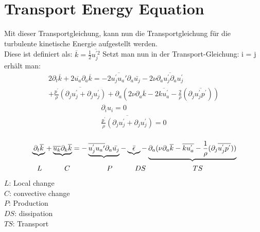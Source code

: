 \documentclass[11pt,t]{beamer}
\newcommand*\mean[1]{\overline{#1}}
\begin{document}
\section{Transport Energy Equation}
\begin{frame}
Mit dieser Transportgleichung, kann nun die Transportgleichung für die turbulente kinetische Energie aufgestellt werden.\\
Diese ist definiert als: $\mean{k} = \frac{1}{2}\mean{u_j^{'2}}$
Setzt man nun in der Transport-Gleichung: i = j erhält man:
\begin{align*}
2\partial_t \mean{k} + 2\mean{u_a}\partial_a \mean{k} = -2\overline{u_j^{'}u_a{'}}\partial_a\bar{u_j}
- 2\nu\overline{\partial_au_j^{'}\partial_au_j^{'}}\\+\overline{\frac{p^{'}}{\rho}(\partial_ju_j^{'}+\partial_ju_j^{'})}+\partial_a (2\nu\partial_a\overline{k} -2\overline{k u_a^{'}}-\frac{2}{\rho}(\partial_j\overline{u_j^{'}p^{'}}))
\end{align*}
\begin{align*}
\partial_i u_i = 0\\
\overline{\frac{p^{'}}{\rho}(\partial_ju_j^{'}+\partial_ju_j^{'})} = 0 \\
\end{align*}
\end{frame}
\begin{frame}
\begin{align*}
&\underbrace{\partial_t \mean{k}} + \underbrace{\mean{u_k}\partial_k \mean{k}} = -\underbrace{\overline{u_j^{'}u_a{'}}\partial_a\bar{u_j}}- \underbrace{\bar{\epsilon}} - \underbrace{\partial_a (\nu\partial_a\overline{k} -\overline{k u_a^{'}}-\frac{1}{\rho}(\partial_j\overline{u_j^{'}p^{'}}))}\\
&\hspace{0.3cm}L \hspace{1.1cm}C \hspace{1.8cm}P\hspace{1.1cm} DS \hspace{2.3cm}TS\\
\end{align*}
$L$: Local change\\
$C$: convective change\\
$P$: Production \\
$DS$: dissipation \\
$TS$: Transport \\
\end{frame}
\end{document}
